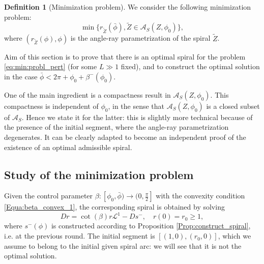 \documentclass[reqno]{amsart}
\newcounter{assu}
\theoremstyle{definition} \newtheorem{definition}{Definition}[section]
\theoremstyle{definition} \newtheorem{remark}[definition]{Remark}
\theoremstyle{plain} \newtheorem{lemma}[definition]{Lemma}
\theoremstyle{plain} \newtheorem{proposition}[definition]{Proposition}
\theoremstyle{plain} \newtheorem{theorem}[definition]{Theorem}
\theoremstyle{plain} \newtheorem{corollary}[definition]{Corollary}
\theoremstyle{definition} \newtheorem{example}[definition]{Example}
\theoremstyle{plain} \newtheorem{claim}[clai]{Claim}
\theoremstyle{definition} \newtheorem{assumption}[definition]{Assumption}
\theoremstyle{definition} \newtheorem{observation}[definition]{Observation}
\newcommand{\1}{\mathbbm 1}
\numberwithin{equation}{section} %
\theoremstyle{plain} \newtheorem*{theorem*}{Theorem}
\theoremstyle{plain} \newtheorem{mthm}[maintheorem]{Main Theorem}
\theoremstyle{plain} \newtheorem*{mthm*}{Main Theorem}
\theoremstyle{plain} \newtheorem*{conjecture*}{Conjecture}
\theoremstyle{plain} \newtheorem{conjecture}[definition]{Conjecture}
\theoremstyle{plain} \newtheorem*{problem*}{Problem}
\begin{document}
\begin{definition}[Minimization problem]
\label{Def:minimi_sect_4}
We consider the following minimization problem:
\begin{equation}
\label{eq:min:probl_pert}
\min \big\{ r_{\tilde Z}({\bar \phi}), \tilde Z \in \mathcal A_S(Z,{\phi_0}) \big\}, %
\end{equation}
where $(r_{\tilde Z}(\phi),\phi)$ is the angle-ray parametrization of the spiral $\tilde Z$.
\end{definition}

Aim of this section is to prove that there is an optimal spiral for the problem \eqref{eq:min:probl_pert} (for  some $L \gg 1$ fixed), and to construct the optimal solution in the case $\bar \phi < 2\pi + \phi_0 + \beta^-(\phi_0)$.

One of the main ingredient is a compactness result in $\mathcal A_S(Z,{\phi_0})$. This compactness is independent of ${\phi_0}$, in the sense that $\mathcal A_S(Z,\phi_0)$ is a closed subset of $\mathcal A_S$. Hence we state it for the latter: this is slightly more technical because of the presence of the initial segment, where the angle-ray parametrization degenerates. It can be clearly adapted to become an independent proof of the existence of an optimal admissible spiral.


\subsection{Study of the minimization problem}
\label{Ss:existence_minimum}


Given the control parameter $\beta : [{\phi_0},{\bar \phi}) \to (0,\frac{\pi}{2}]$ with the convexity condition \eqref{Equa:beta_convex_1}, the corresponding spiral is obtained by solving
\begin{equation}
\label{Equa:Dr+_dR-_again_1}
Dr = \cot(\beta) r \mathscr L^1 - Ds^-, \quad r(0) = r_0 \geq 1,
\end{equation}
where $s^-(\phi)$ is constructed according to Proposition \ref{Prop:construct_spiral}, i.e. at the previous round. The initial segment is $[(1,0),(r_0,0)]$, which we assume to belong to the initial given spiral arc: we will see that it is not the optimal solution.
\end{document}
